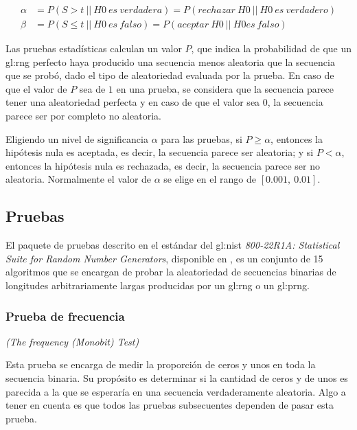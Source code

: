 \begin{align}
  \alpha &= P(S > t\: ||\: H0\: es\: verdadera)
          = P(rechazar\: H0\: ||\: H0\: es\: verdadero)\\
  \beta  &= P(S \leq t\: ||\: H0\: es\: falso)
          = P(aceptar\: H0\: ||\: H0 es\: falso)
\end{align}

Las pruebas estadísticas calculan un valor $P$, que indica la probabilidad de
que un \gls{gl:rng} perfecto haya producido una secuencia menos aleatoria que
la secuencia que se probó, dado el tipo de aleatoriedad evaluada por la prueba.
En caso de que el valor de $P$ sea de $1$ en una prueba, se considera que la
secuencia parece tener una aleatoriedad perfecta y en caso de que el valor
sea $0$, la secuencia parece ser por completo no aleatoria.

Eligiendo un nivel de significancia $\alpha$ para las pruebas, si $P \geq
\alpha$, entonces la hipótesis nula es aceptada, es decir, la secuencia
parece ser aleatoria; y si $P < \alpha$, entonces la hipótesis nula es
rechazada, es decir, la secuencia parece ser no aleatoria. Normalmente
el valor de $\alpha$ se elige en el rango de $[0.001,\: 0.01]$.

\subsection{Pruebas} %
\label{sec:lista_pruebas}

El paquete de pruebas descrito en el estándar del \gls{gl:nist}
\textit{800-22R1A: Statistical Suite for Random Number Generators}, disponible
en \cite{nist_pruebas}, es un conjunto de 15 algoritmos que se encargan de
probar la aleatoriedad de secuencias binarias de longitudes arbitrariamente
largas producidas por un \gls{gl:rng} o un \gls{gl:prng}.

\subsubsection{Prueba de frecuencia} %
\textit{(The frequency (Monobit) Test)}

Esta prueba se encarga de medir la proporción de ceros y unos en toda la
secuencia binaria. Su propósito es determinar si la cantidad de ceros y de
unos es parecida a la que se esperaría en una secuencia verdaderamente
aleatoria. Algo a tener en cuenta es que todos las pruebas subsecuentes
dependen de pasar esta prueba.

